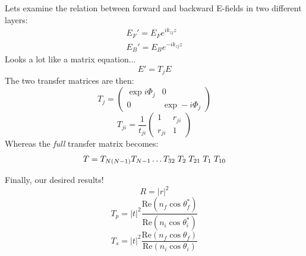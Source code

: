 \documentclass{beamer}
\begin{document}
\begin{frame}



Lets examine the relation between forward and backward E-fields in two different layers:
\begin{align}\label{system2}
	E_{F}' = E_{F} e^{ i k_{zj} z }  \nonumber \\
	E_{B}' = E_{B} e^{ -i  k_{zj} z }
\end{align}
Looks a lot like a matrix equation...
\begin{equation}
	E' = T_{j} E
\end{equation}
The two transfer matrices are then:
\begin{equation}\label{Tj}
	T_{j} = 
	\begin{pmatrix}
		\exp i \Phi_{j} & 0 \\
		0 & \exp - i \Phi_{j}
	\end{pmatrix}
\end{equation}
\begin{equation}\label{Tji}
	T_{ji} = \frac{1}{t_{ji}}
	\begin{pmatrix}
		1 & r_{ji} \\
		r_{ji} & 1
	\end{pmatrix}
\end{equation}
Whereas the \textit{full} transfer matrix becomes:
\begin{equation}
	T = T_{N(N-1)} T_{N-1} \hdots T_{32} \hspace{1mm} T_{2} \hspace{1mm} T_{21} \hspace{1mm} T_{1} \hspace{1mm} T_{10}
\end{equation}



\end{frame}






\begin{frame}



Finally, our desired results! 
\begin{equation}
	R = |r|^{2}
\end{equation}
\begin{equation}
	T_{p} = |t|^{2} \frac{  \mathrm{Re} ( n_{f} \cos \theta_{f}^{*} )  }{ \mathrm{Re} ( n_{i} \cos \theta_{i}^{*}  ) }
\end{equation}
\begin{equation}
	T_{s} = |t|^{2} \frac{  \mathrm{Re} ( n_{f} \cos \theta_{f} )  }{ \mathrm{Re} ( n_{i} \cos \theta_{i} ) }
\end{equation}



\end{frame}
\end{document}
